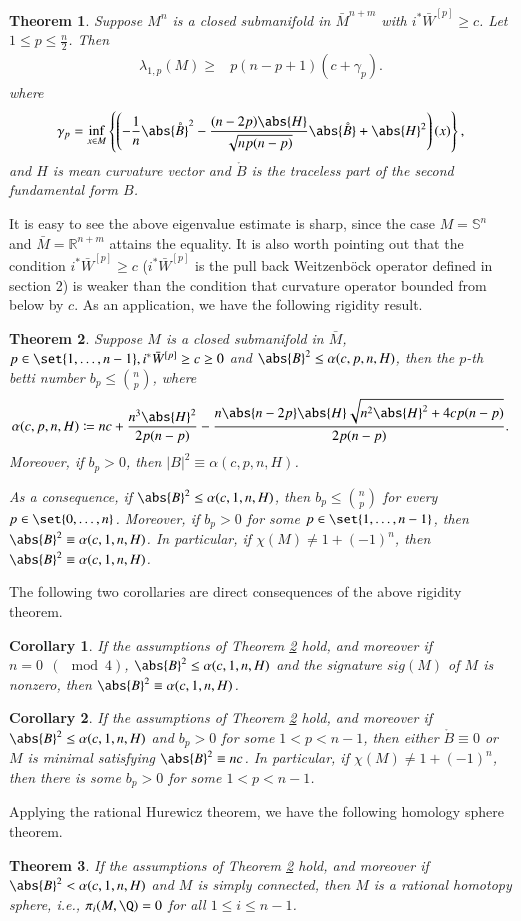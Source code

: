 \documentclass[12pt]{amsart}
\theoremstyle{plain}
\newtheorem{theorem}{Theorem}[section]
\newtheorem{cor}[cor]{Corollary}
\theoremstyle{remark}
\theoremstyle{definition}
\numberwithin{equation}{section}
\begin{document}
\begin{theorem}\label{eigenest}
Suppose $M^n$ is a closed submanifold in $\bar{M}^{n+m}$
with $i^*\bar{W}^{[p]}\geq c$. Let $1\le p\le\frac{n}{2}$. Then
\begin{align*}
\lambda_{1,p}(M)\geq&p(n-p+1)
\left(c+\gamma_p\right).
\end{align*}
where $$\gamma_p=\inf_{x\in M}\left\{\left(-\dfrac{1}{n}\abs{\mathring{B}}^2
-\dfrac{(n-2p)\abs{H}}{\sqrt{np(n-p)}}
\abs{\mathring{B}}+\abs{H}^2\right)(x)\right\},$$ and $H$ is mean curvature vector and $\mathring{B}$ is the
traceless part of the second fundamental form $B$.
\end{theorem}
It is easy to see the above eigenvalue estimate is sharp, since the case
 $M=\mathbb S^n$ and $\bar{M}=\mathbb R^{n+m}$ attains the equality.
It is also worth pointing out that the condition  $i^*\bar{W}^{[p]}\ge c$
($i^*\bar{W}^{[p]}$ is the pull back Weitzenb\"{o}ck operator defined in section 2)
 is weaker
than the condition that curvature operator bounded from below by $c$.
As an application, we have the following rigidity result.
\begin{theorem}\label{rigidthm}
Suppose $M$ is a closed submanifold in $\bar M$, $p\in\set{1,\dotsc, n-1}, i^*\bar W^{[p]}\geq c\geq0$ and $\abs{B}^2\leq\alpha(c,p,n,H)$,
then the $p$-th betti number $b_p\leq\binom{n}{p}$,
where
\begin{align*}
\alpha(c,p,n,H)\coloneqq nc+\dfrac{n^3\abs{H}^2}{2p(n-p)}-\dfrac{n\abs{n-2p}\abs{H}\sqrt{n^2\abs{H}^2+4cp(n-p)}}{2p(n-p)}.
\end{align*}
Moreover, if $b_p>0$, then $\vert B\vert^2\equiv\alpha(c,p,n,H)$.

As a consequence, if $\abs{B}^2\leq\alpha(c,1,n,H)$, then $b_p\leq\binom{n}{p}$ for every $p\in\set{0,\dotsc,n}$. Moreover, if $b_p>0$ for some $p\in\set{1,\dotsc, n-1}$, then $\abs{B}^2\equiv\alpha(c,1,n,H)$. In particular, if $\chi(M)\neq1+(-1)^n$, then $\abs{B}^2\equiv\alpha(c,1,n,H)$.
\end{theorem}
The following two corollaries are direct consequences of the above rigidity theorem.
\begin{cor}If the assumptions of Theorem \ref{rigidthm} hold, and moreover if
 $n=0 \ \ (\mod4)$, $\abs{B}^2\leq\alpha(c,1,n,H)$ and the signature $sig(M)$ of $M$ is nonzero, then $\abs{B}^2\equiv\alpha(c,1,n,H)$.
\end{cor}
\begin{cor}If the assumptions of Theorem \ref{rigidthm} hold, and moreover if
 $\abs{B}^2\leq\alpha(c,1,n,H)$ and $b_p>0$ for some $1<p<n-1$, then either $\mathring{B}\equiv0$ or $M$ is minimal satisfying $\abs{B}^2\equiv nc$. In particular, if $\chi(M)\neq 1+(-1)^n$, then there is some $b_p>0$ for some $1<p<n-1$.
\end{cor}
Applying the rational Hurewicz theorem, we have the following homology sphere theorem.
\begin{theorem}\label{rationalsphere1}
If the assumptions of Theorem \ref{rigidthm} hold, and moreover if
$\abs{B}^2<\alpha(c,1,n,H)$ and $M$ is simply connected,
then $M$ is a rational homotopy sphere, i.e.,
$\pi_i(M,\Q)=0$ for all $1\leq i\leq n-1$.
\end{theorem}
\end{document}
